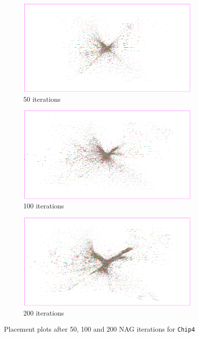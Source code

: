 \begin{figure}[p]
 \centering

 \begin{subfigure}{0.75\textwidth}
  \includegraphics[width=\textwidth]{epsilon/placement_Chip4_50_iterations.png}
  \caption{50 iterations}
 \end{subfigure}
 
 \bigskip
 
 \begin{subfigure}{0.75\textwidth}
  \includegraphics[width=\textwidth]{epsilon/placement_Chip4_100_iterations.png}
  \caption{100 iterations}
 \end{subfigure}
 
 \bigskip
 
 \begin{subfigure}{0.75\textwidth}
  \includegraphics[width=\textwidth]{epsilon/placement_Chip4_200_iterations.png}
  \caption{200 iterations}
 \end{subfigure}

 \caption{Placement plots after 50, 100 and 200 NAG iterations for \texttt{Chip4}}
 \label{fig:placement_Chip4_depending_on_max_iterations}
\end{figure}

